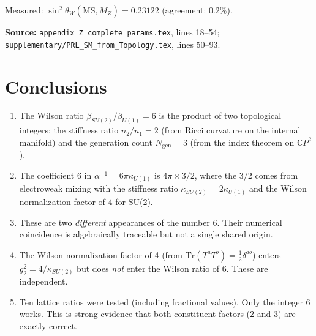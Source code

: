 \documentclass[11pt]{article}
\begin{document}
Measured: $\sin^2\theta_W(\overline{\mathrm{MS}}, M_Z) = 0.23122$
(agreement: 0.2\%).

\textbf{Source:} \texttt{appendix\_Z\_complete\_params.tex}, lines 18--54;
\texttt{supplementary/PRL\_SM\_from\_Topology.tex}, lines 50--93.

\section{Conclusions}

\begin{enumerate}
\item The Wilson ratio $\beta_{SU(2)}/\beta_{U(1)} = 6$ is the product
      of two topological integers: the stiffness ratio $n_2/n_1 = 2$
      (from Ricci curvature on the internal manifold) and the generation
      count $N_{\mathrm{gen}} = 3$ (from the index theorem on
      $\mathbb{C}P^2$).

\item The coefficient 6 in $\alpha^{-1} = 6\pi\kappa_{U(1)}$ is
      $4\pi \times 3/2$, where the $3/2$ comes from electroweak mixing
      with the stiffness ratio $\kappa_{SU(2)} = 2\kappa_{U(1)}$ and
      the Wilson normalization factor of 4 for SU(2).

\item These are two \emph{different} appearances of the number 6.
      Their numerical coincidence is algebraically traceable but not
      a single shared origin.

\item The Wilson normalization factor of 4 (from
      $\mathrm{Tr}(T^aT^b) = \frac{1}{2}\delta^{ab}$) enters
      $g_2^2 = 4/\kappa_{SU(2)}$ but does \emph{not} enter the Wilson
      ratio of 6.  These are independent.

\item Ten lattice ratios were tested (including fractional values).
      Only the integer 6 works.  This is strong evidence that both
      constituent factors (2 and 3) are exactly correct.
\end{enumerate}
\end{document}
